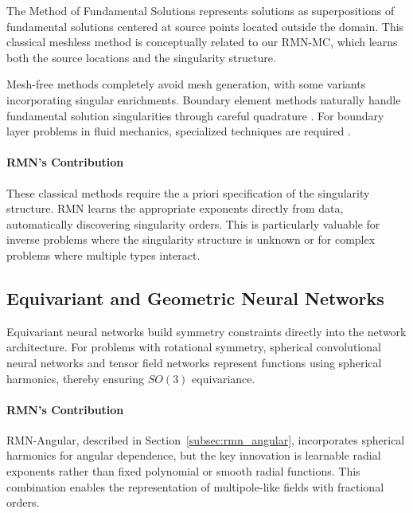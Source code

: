 \documentclass[twoside,11pt]{article}
\begin{document}
The Method of Fundamental Solutions \citep{fairweather1998method} represents solutions as superpositions of fundamental solutions centered at source points located outside the domain. This classical meshless method is conceptually related to our RMN-MC, which learns both the source locations and the singularity structure.

Mesh-free methods \citep{belytschko1996meshless, liu2003mesh} completely avoid mesh generation, with some variants incorporating singular enrichments. Boundary element methods naturally handle fundamental solution singularities through careful quadrature \citep{sauter2010boundary}. For boundary layer problems in fluid mechanics, specialized techniques are required \citep{schlichting2017boundary}.

\paragraph{RMN's Contribution} These classical methods require the a priori specification of the singularity structure. RMN learns the appropriate exponents directly from data, automatically discovering singularity orders. This is particularly valuable for inverse problems where the singularity structure is unknown or for complex problems where multiple types interact.

\subsection{Equivariant and Geometric Neural Networks}

Equivariant neural networks \citep{cohen2016group, weiler2019general} build symmetry constraints directly into the network architecture. For problems with rotational symmetry, spherical convolutional neural networks \citep{cohen2018spherical} and tensor field networks \citep{thomas2018tensor} represent functions using spherical harmonics, thereby ensuring $SO(3)$ equivariance.

\paragraph{RMN's Contribution} RMN-Angular, described in Section~\ref{subsec:rmn_angular}, incorporates spherical harmonics for angular dependence, but the key innovation is learnable radial exponents rather than fixed polynomial or smooth radial functions. This combination enables the representation of multipole-like fields with fractional orders.
\end{document}
